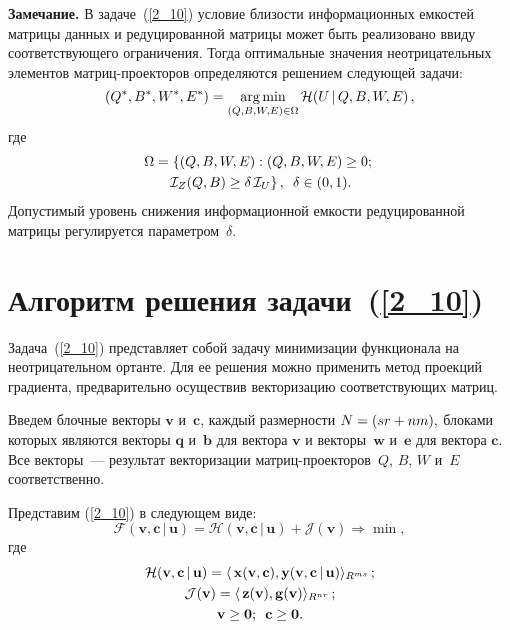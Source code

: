 \begin{multicols}{2}
\smallskip

\noindent
\textbf{Замечание.} В задаче~(\ref{2_10}) условие близости информационных 
емкостей матрицы данных и редуцированной матрицы может быть реализовано ввиду 
соответствующего ограничения.
Тогда оптимальные значения неотрицательных элементов мат\-риц-про\-ек\-то\-ров 
определяются решением следующей за\-дачи:
\begin{equation*}
(Q^*,B^*,W^*,E^*) = \mathop{\mathrm{arg}\,\mathrm{min}}\limits_{(Q,B,W,E) \in \Omega} 
\mathcal{H}(U\,|\,Q,B,W,E)\,,
\end{equation*}
где
\begin{multline*}
\Omega = \left\{(Q,B,W,E): (Q,B,W,E) \ge 0; \right.\\
\left.\mathcal{I}_Z(Q,B) \ge 
\delta\,\mathcal{I}_U\right\},\enskip \delta \in (0,1).
\end{multline*}
Допустимый уровень снижения информационной емкости редуцированной матрицы 
регулируется параметром~$\delta$.

\section{Алгоритм решения задачи~(\ref{2_10})}

Задача~(\ref{2_10}) представляет собой задачу минимизации функционала на 
неотрицательном ортанте. Для ее решения можно применить метод проекций 
градиента, предварительно осуществив векторизацию соответствующих матриц.

Введем блочные векторы $\mathbf{v}$ и~$\mathbf{c}$, каждый размерности
$N\hm = (sr \hm+ nm),$
блоками которых являются векторы $\mathbf{q}$ и~$\mathbf{b}$ для вектора 
$\mathbf{v}$ и векторы~$\mathbf{w}$ и~$\mathbf{e}$ для вектора $\mathbf{c}$. 
Все векторы~--- результат векторизации мат\-риц-про\-ек\-то\-ров~$Q$, $B$, $W$ и~$E$ 
соответственно.

Представим (\ref{2_10})  в следующем виде:
\begin{equation*}
\mathcal{F}(\mathbf{v}, \mathbf{c}\,|\,\mathbf{u}) = \mathcal{H}(\mathbf{v}, 
\mathbf{c}\,|\,\mathbf{u}) + \mathcal{J}(\mathbf{v}) \Rightarrow \min,
\end{equation*}
где
\begin{gather*}
\mathcal{H}(\mathbf{v}, \mathbf{c}\,|\,\mathbf{u}) = 
\langle\,\mathbf{x}(\mathbf{v}, \mathbf{c}), \mathbf{y}(\mathbf{v}, 
\mathbf{c}\,|\,\mathbf{u})\rangle_{R^{ms}}\,;\\
\mathcal{J}(\mathbf{v}) = \langle\,\mathbf{z}(\mathbf{v}),  
\mathbf{g}(\mathbf{v}) \rangle_{R^{nr}}\,;\\
\mathbf{v} \geq  \mathbf{0};\enskip \mathbf{c} \geq  \mathbf{0}.
\end{gather*}


\end{multicols}
